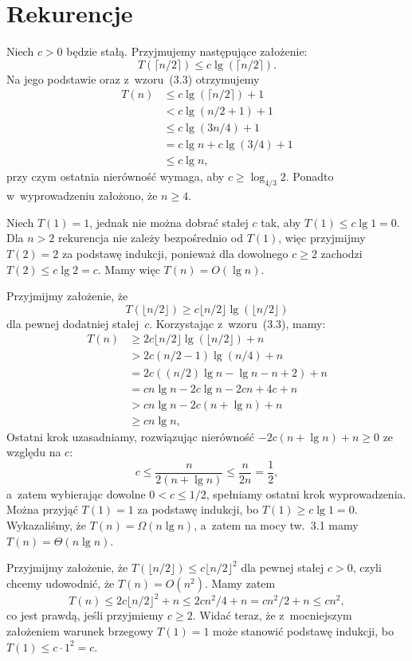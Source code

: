 \chapter{Rekurencje}


\exercise %
Niech $c>0$ będzie stałą. Przyjmujemy następujące założenie:
\[
	T(\lceil n/2\rceil) \le c\lg(\lceil n/2\rceil).
\]
Na jego podstawie oraz z~wzoru~(3.3) otrzymujemy
\begin{align*}
	T(n) &\le c\lg(\lceil n/2\rceil)+1 \\
	&< c\lg(n/2+1)+1 \\
	&\le c\lg(3n/4)+1 \\
	&= c\lg n+c\lg(3/4)+1 \\
	&\le c\lg n,
\end{align*}
przy czym ostatnia nierówność wymaga, aby $c\ge\log_{4/3}2$. Ponadto w~wyprowadzeniu założono, że $n\ge4$.

Niech $T(1)=1$, jednak nie można dobrać stałej $c$ tak, aby $T(1)\le c\lg1=0$. Dla $n>2$ rekurencja nie zależy bezpośrednio od $T(1)$, więc przyjmijmy $T(2)=2$ za podstawę indukcji, ponieważ dla dowolnego $c\ge2$ zachodzi $T(2)\le c\lg 2=c$. Mamy więc $T(n)=O(\lg n)$.

\exercise %
Przyjmijmy założenie, że
\[
	T(\lfloor n/2\rfloor) \ge c\lfloor n/2\rfloor\lg(\lfloor n/2\rfloor)
\]
dla pewnej dodatniej stałej~$c$. Korzystając z~wzoru~(3.3), mamy:
\begin{align*}
	T(n) &\ge 2c\lfloor n/2\rfloor\lg(\lfloor n/2\rfloor)+n \\
	&> 2c(n/2-1)\lg(n/4)+n \\
	&= 2c((n/2)\lg n-\lg n-n+2)+n \\
	&= cn\lg n-2c\lg n-2cn+4c+n \\
	&> cn\lg n-2c(n+\lg n)+n \\
	&\ge cn\lg n,
\end{align*}
Ostatni krok uzasadniamy, rozwiązując nierówność $-2c(n+\lg n)+n\ge0$ ze względu na $c$:
\[
	c \le \frac{n}{2(n+\lg n)} \le \frac{n}{2n} = \frac{1}{2},
\]
a~zatem wybierając dowolne $0<c\le1/2$, spełniamy ostatni krok wyprowadzenia. Można przyjąć $T(1)=1$ za podstawę indukcji, bo $T(1)\ge c\lg1=0$. Wykazaliśmy, że $T(n)=\Omega(n\lg n)$, a~zatem na mocy tw.~3.1 mamy $T(n)=\Theta(n\lg n)$.

\exercise %
Przyjmijmy założenie, że $T(\lfloor n/2\rfloor)\le c\lfloor n/2\rfloor^2$ dla pewnej stałej $c>0$, czyli chcemy udowodnić, że $T(n)=O(n^2)$. Mamy zatem
\[
	T(n) \le 2c\lfloor n/2\rfloor^2+n \le 2cn^2\!/4 + n = cn^2\!/2+n \le cn^2,
\]
co jest prawdą, jeśli przyjmiemy $c\ge2$. Widać teraz, że z~mocniejszym założeniem warunek brzegowy $T(1)=1$ może stanowić podstawę indukcji, bo $T(1)\le c\cdot1^2=c$.

